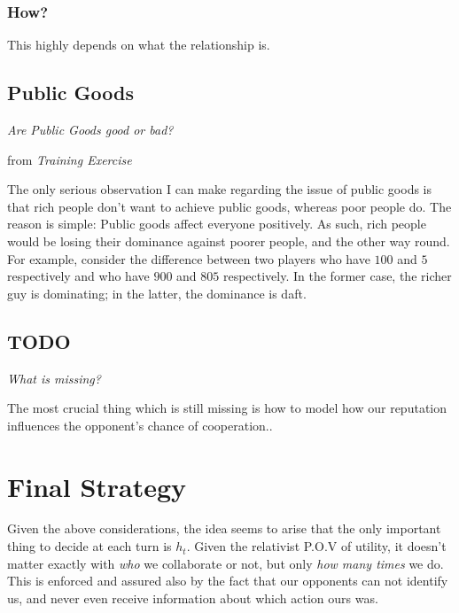 \documentclass[10pt,fleqn]{article}
\begin{document}
\subsubsection{How?}

This highly depends on what the relationship is.

\subsection{Public Goods}
\emph{Are Public Goods good or bad?}

\begin{quotation}
\end{quotation}
\hfill from \emph{Training Exercise}

The only serious observation I can make regarding the issue of public goods is
that rich people don't want to achieve public goods, whereas poor people do. The
reason is simple: Public goods affect everyone positively. As such, rich people
would be losing their dominance against poorer people, and the other way round.
For example, consider the difference between two players who have $100$ and $5$
respectively and who have $900$ and $805$ respectively. In the former case, the
richer guy is dominating; in the latter, the dominance is daft.

\subsection{TODO}
\emph{What is missing?}

The most crucial thing which is still missing is how to model how our reputation
influences the opponent's chance of cooperation..

\section{Final Strategy}

Given the above considerations, the idea seems to arise that the only important
thing to decide at each turn is $h_t$. Given the relativist P.O.V of utility, it
doesn't matter exactly with \emph{who} we collaborate or not, but only \emph{how
many times} we do. This is enforced and assured also by the fact that our
opponents can not identify us, and never even receive information about which
action ours was.
\end{document}
